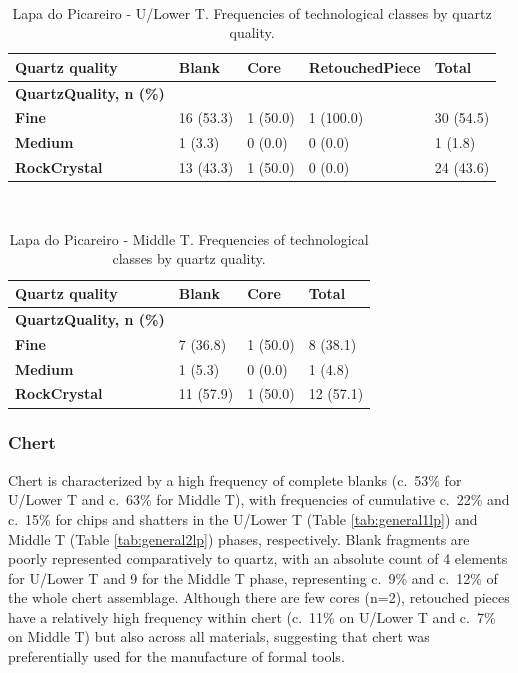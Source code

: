 \documentclass[12pt,twoside]{reedthesis}
\begin{document}
~
\begin{table}[!h]

\caption{\label{tab:quartzqualityTG}Lapa do Picareiro - U/Lower T. Frequencies of technological classes by quartz quality.}
\centering
\fontsize{9}{11}\selectfont
\begin{tabular}[t]{>{\bfseries}lllll}
\toprule
Quartz quality & Blank & Core & RetouchedPiece & Total\\
\midrule
QuartzQuality, n (\%) &  &  &  & \\
Fine & 16 (53.3) & 1 (50.0) & 1 (100.0) & 30 (54.5)\\
Medium & 1 (3.3) & 0 (0.0) & 0 (0.0) & 1 (1.8)\\
RockCrystal & 13 (43.3) & 1 (50.0) & 0 (0.0) & 24 (43.6)\\
\bottomrule
\end{tabular}
\end{table}
~
\begin{table}[!h]

\caption{\label{tab:quartzqualityPR}Lapa do Picareiro - Middle T. Frequencies of technological classes by quartz quality.}
\centering
\fontsize{9}{11}\selectfont
\begin{tabular}[t]{>{\bfseries}llll}
\toprule
Quartz quality & Blank & Core & Total\\
\midrule
QuartzQuality, n (\%) &  &  & \\
Fine & 7 (36.8) & 1 (50.0) & 8 (38.1)\\
Medium & 1 (5.3) & 0 (0.0) & 1 (4.8)\\
RockCrystal & 11 (57.9) & 1 (50.0) & 12 (57.1)\\
\bottomrule
\end{tabular}
\end{table}
\newpage

\hypertarget{chert-1}{%
\subsubsection{Chert}\label{chert-1}}

Chert is characterized by a high frequency of complete blanks (c.~53\% for U/Lower T and c.~63\% for Middle T), with frequencies of cumulative c.~22\% and c.~15\% for chips and shatters in the U/Lower T (Table \ref{tab:general1lp}) and Middle T (Table \ref{tab:general2lp}) phases, respectively. Blank fragments are poorly represented comparatively to quartz, with an absolute count of 4 elements for U/Lower T and 9 for the Middle T phase, representing c.~9\% and c.~12\% of the whole chert assemblage. Although there are few cores (n=2), retouched pieces have a relatively high frequency within chert (c.~11\% on U/Lower T and c.~7\% on Middle T) but also across all materials, suggesting that chert was preferentially used for the manufacture of formal tools.
\end{document}
